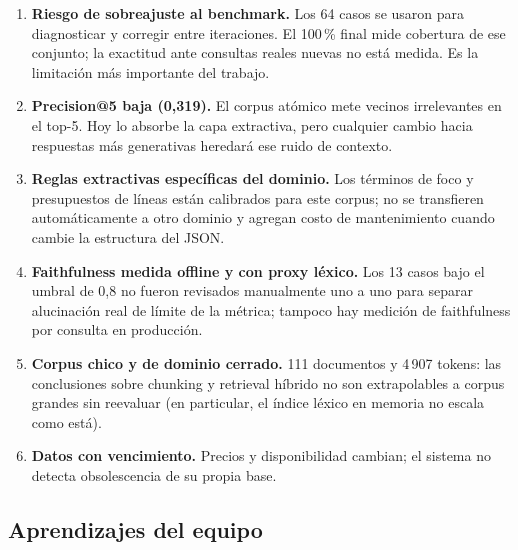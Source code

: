 \documentclass[11pt,a4paper]{article}
\begin{document}
\begin{enumerate}
    \item \textbf{Riesgo de sobreajuste al benchmark.} Los 64 casos se
    usaron para diagnosticar y corregir entre iteraciones. El 100\,\% final
    mide cobertura de ese conjunto; la exactitud ante consultas reales
    nuevas no está medida. Es la limitación más importante del trabajo.
    \item \textbf{Precision@5 baja (0{,}319).} El corpus atómico mete
    vecinos irrelevantes en el top-5. Hoy lo absorbe la capa extractiva,
    pero cualquier cambio hacia respuestas más generativas heredará ese
    ruido de contexto.
    \item \textbf{Reglas extractivas específicas del dominio.} Los términos
    de foco y presupuestos de líneas están calibrados para este corpus; no
    se transfieren automáticamente a otro dominio y agregan costo de
    mantenimiento cuando cambie la estructura del JSON.
    \item \textbf{Faithfulness medida offline y con proxy léxico.} Los 13
    casos bajo el umbral de 0{,}8 no fueron revisados manualmente uno a uno
    para separar alucinación real de límite de la métrica; tampoco hay
    medición de faithfulness por consulta en producción.
    \item \textbf{Corpus chico y de dominio cerrado.} 111 documentos y
    4\,907 tokens: las conclusiones sobre chunking y retrieval híbrido no
    son extrapolables a corpus grandes sin reevaluar (en particular, el
    índice léxico en memoria no escala como está).
    \item \textbf{Datos con vencimiento.} Precios y disponibilidad cambian;
    el sistema no detecta obsolescencia de su propia base.
\end{enumerate}

\subsection{Aprendizajes del equipo}
\end{document}
